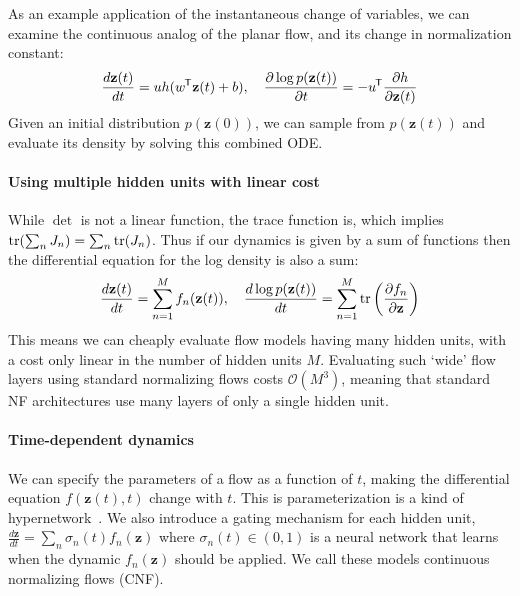 \documentclass{article}
\newcommand{\tr}{\textnormal{tr}}
\newcommand*{\tran}{^{\mkern-1.5mu\mathsf{T}}}
\newcommand{\vz}{\mathbf{z}}
\newcommand{\sol}{\vz}  %
\newcommand{\cnfx}{\sol}
\begin{document}
As an example application of the instantaneous change of variables, we can examine the continuous analog of the planar flow, and its change in normalization constant:
\begin{align}\label{eq:cnf}
\frac{d{\cnfx}(t)}{dt} = uh(w\tran{}{\cnfx}(t) + b),\quad \frac{\partial\log p({\cnfx}(t))}{\partial t} = -u\tran{} \frac{\partial h}{\partial {\cnfx}(t)}
\end{align}
Given an initial distribution $p({\cnfx}(0))$, we can sample from $p({\cnfx}(t))$ and evaluate its density by solving this combined ODE.





\paragraph{Using multiple hidden units with linear cost}
While $\det$ is not a linear function, the trace function is, which implies $\tr(\sum_n J_n) = \sum_n \tr(J_n)$.
Thus if our dynamics is given by a sum of functions then the differential equation for the log density is also a sum:
\begin{align}
\frac{d{\cnfx}(t)}{dt} = \sum_{n=1}^M f_n({\cnfx}(t)),\quad \frac{d\log p({\cnfx}(t))}{dt} = \sum_{n=1}^M \tr\left(\frac{\partial f_n}{\partial {\cnfx}}\right)
\end{align}
This means we can cheaply evaluate flow models having many hidden units, with a cost only linear in the number of hidden units $M$.
Evaluating such `wide' flow layers using standard normalizing flows costs $\mathcal{O}(M^3)$, meaning that standard NF architectures use many layers of only a single hidden unit.

\paragraph{Time-dependent dynamics}
We can specify the parameters of a flow as a function of $t$, making the differential equation $f({\cnfx}(t), t)$ change with $t$.
This is parameterization is a kind of hypernetwork~\citep{ha2016hypernetworks}.
We also introduce a gating mechanism for each hidden unit, $\frac{d{\cnfx}}{dt} = \sum_n \sigma_n(t) f_n({\cnfx})$ where $\sigma_n(t) \in (0, 1)$ is a neural network that learns when the dynamic $f_n({\cnfx})$ should be applied.
We call these models continuous normalizing flows (CNF).
\end{document}
